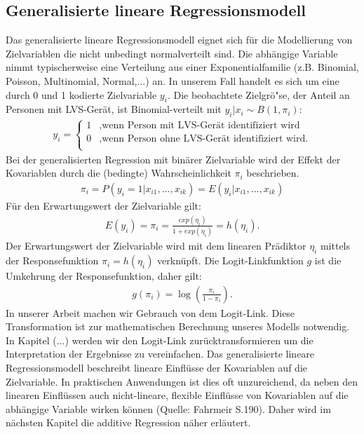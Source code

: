 \documentclass[12pt]{scrreprt}
\begin{document}
\subsection{Generalisierte lineare Regressionsmodell}
Das generalisierte lineare Regressionsmodell eignet sich für die Modellierung von Zielvariablen die nicht unbedingt normalverteilt sind. Die abhängige Variable nimmt typischerweise eine Verteilung aus einer Exponentialfamilie (z.B. Binomial, Poisson, Multinomial, Normal,...) an. In unserem Fall handelt es sich um eine durch 0 und 1 kodierte Zielvariable $y_{i}$. Die beobachtete Zielgrö"se, der Anteil an Personen mit LVS-Gerät, ist Binomial-verteilt mit $y_{i}|x_{i}\sim B(1,\pi_{i})$: \\
\begin{align}
y_{i}=\begin{cases}
1 & \text{,wenn Person mit LVS-Gerät identifiziert wird } \\
0 & \text{,wenn Person ohne LVS-Gerät identifiziert wird.} \\
\end{cases}
\end{align}
Bei der generalisierten Regression mit binärer Zielvariable wird der Effekt der Kovariablen durch die (bedingte) Wahrscheinlichkeit $\pi_{i}$ beschrieben.
\begin{align}
\pi_{i}=P(y_{i}=1|x_{i1},...,x_{ik})=E(y_{i}|x_{i1},...,x_{ik})
\end{align}
Für den Erwartungswert der Zielvariable gilt:
\begin{align}
E(y_{i})=\pi_{i}=\frac{exp(\eta_{i})}{1+exp(\eta_{i})}=h(\eta_{i}).
\end{align}
Der Erwartungswert der Zielvariable wird mit dem linearen Prädiktor $\eta_{i}$ mittels der Responsefunktion $\pi_{i}=h(\eta_{i})$ verknüpft. Die Logit-Linkfunktion $g$ ist die Umkehrung der Responsefunktion, daher gilt:
\begin{align}
g(\pi_{i})=\log(\frac{\pi_{i}}{1-\pi_{i}}).
\end{align}
In unserer Arbeit machen wir Gebrauch von dem Logit-Link. Diese Transformation ist zur mathematischen Berechnung unseres Modells notwendig. In Kapitel (...) werden wir den Logit-Link zurücktransformieren um die Interpretation der Ergebnisse zu vereinfachen.
Das generalisierte lineare Regressionsmodell beschreibt lineare Einflüsse der Kovariablen auf die Zielvariable. In praktischen Anwendungen ist dies oft unzureichend, da neben den linearen Einflüssen auch nicht-lineare, flexible Einflüsse von Kovariablen auf die abhängige Variable wirken können (Quelle: Fahrmeir S.190). Daher wird im nächsten Kapitel die additive Regression näher erläutert.
\end{document}
